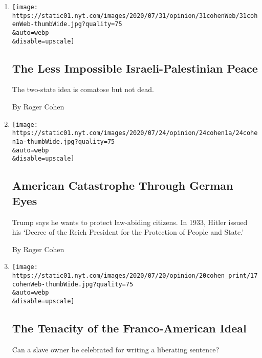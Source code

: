 \begin{enumerate}
\def\labelenumi{\arabic{enumi}.}
\item
  \href{/2020/07/31/opinion/israeli-palestinian-peace.html}{}

  \texttt{[image: https://static01.nyt.com/images/2020/07/31/opinion/31cohenWeb/31cohenWeb-thumbWide.jpg?quality=75\\\&auto=webp\\\&disable=upscale]}

  \hypertarget{the-less-impossible-israeli-palestinian-peace}{%
  \subsection{The Less Impossible Israeli-Palestinian
  Peace}\label{the-less-impossible-israeli-palestinian-peace}}

  The two-state idea is comatose but not dead.

  By Roger Cohen
\item
  \href{/2020/07/24/opinion/trump-germany.html}{}

  \texttt{[image: https://static01.nyt.com/images/2020/07/24/opinion/24cohen1a/24cohen1a-thumbWide.jpg?quality=75\\\&auto=webp\\\&disable=upscale]}

  \hypertarget{american-catastrophe-through-german-eyes}{%
  \subsection{American Catastrophe Through German
  Eyes}\label{american-catastrophe-through-german-eyes}}

  Trump says he wants to protect law-abiding citizens. In 1933, Hitler
  issued his `Decree of the Reich President for the Protection of People
  and State.'

  By Roger Cohen
\item
  \href{/2020/07/17/opinion/france-america-thomas-jefferson-race.html}{}

  \texttt{[image: https://static01.nyt.com/images/2020/07/20/opinion/20cohen\_print/17cohenWeb-thumbWide.jpg?quality=75\\\&auto=webp\\\&disable=upscale]}

  \hypertarget{the-tenacity-of-the-franco-american-ideal}{%
  \subsection{The Tenacity of the Franco-American
  Ideal}\label{the-tenacity-of-the-franco-american-ideal}}

  Can a slave owner be celebrated for writing a liberating sentence?


\end{enumerate}
